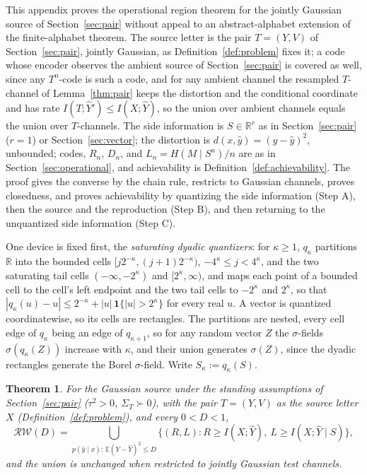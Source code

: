 \documentclass[11pt,onecolumn]{IEEEtran}
\newtheorem{theorem}{Theorem}
\newcommand{\E}{\mathbb{E}}
\newcommand{\R}{\mathbb{R}}
\newcommand{\hY}{\widehat{Y}}
\newcommand{\RW}{\mathcal{R}\!\mathcal{W}}
\begin{document}
This appendix proves the operational region theorem for the jointly
Gaussian source of Section~\ref{sec:pair} without appeal to an
abstract-alphabet extension of the finite-alphabet theorem. The source letter
is the pair $T=(Y,V)$ of Section~\ref{sec:pair}, jointly Gaussian, as
Definition~\ref{def:problem} fixes it; a code whose encoder observes the
ambient source of Section~\ref{sec:pair} is covered as well, since any
$T^n$-code is such a code, and for any ambient channel the resampled
$T$-channel of Lemma~\ref{thm:pair} keeps the distortion and the
conditional coordinate and has rate $I(T;\hY')\le I(X;\hY)$, so the union
over ambient channels equals the union over $T$-channels. The
side information is $S\in\R^r$ as in
Section~\ref{sec:pair} ($r=1$) or Section~\ref{sec:vector}; the
distortion is
$d(x,\hat y)=(y-\hat y)^2$, unbounded; codes, $R_n$, $D_n$, and
$L_n=H(M\mid S^n)/n$ are as in Section~\ref{sec:operational}, and
achievability is Definition~\ref{def:achievability}. The proof gives
the converse by the chain rule, restricts to Gaussian channels, proves
closedness, and proves achievability by quantizing the side information
(Step A), then the source and the reproduction (Step B), and then
returning to the unquantized side information (Step C).

One device is fixed first, the \emph{saturating dyadic quantizers}:
for $\kappa\ge1$, $q_\kappa$ partitions $\R$ into the bounded cells
$[j2^{-\kappa},(j+1)2^{-\kappa})$, $-4^\kappa\le j<4^\kappa$, and the two saturating tail
cells $(-\infty,-2^\kappa)$ and $[2^\kappa,\infty)$, and maps each point of a
bounded cell to the cell's left endpoint and the two tail cells to
$-2^\kappa$ and $2^\kappa$, so that $|q_\kappa(u)-u|\le2^{-\kappa}+|u|\,\mathbf 1\{|u|>2^\kappa\}$
for every real $u$. A vector is quantized coordinatewise, so its cells
are rectangles. The partitions are nested, every cell edge of $q_\kappa$
being an edge of $q_{\kappa+1}$, so for any random vector $Z$ the
$\sigma$-fields $\sigma(q_\kappa(Z))$ increase with $\kappa$, and their union
generates $\sigma(Z)$, since the dyadic rectangles generate the Borel
$\sigma$-field. Write $S_\kappa:=q_\kappa(S)$.

\begin{theorem}\label{thm:gaussop}
For the Gaussian source under the standing assumptions of
Section~\ref{sec:pair} ($\tau^2>0$, $\Sigma_T\succ0$), with the pair
$T=(Y,V)$ as the source letter $X$ (Definition~\ref{def:problem}), and
every $0<D<1$,
\[
\RW(D)=\bigcup_{p(\hat y\mid x):\,\E(Y-\hY)^2\le D}
\bigl\{(R,L):R\ge I(X;\hY),\ L\ge I(X;\hY\mid S)\bigr\},
\]
and the union is unchanged when restricted to jointly Gaussian test
channels.
\end{theorem}
\end{document}
